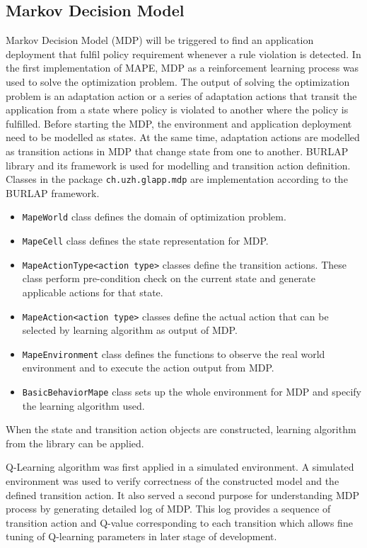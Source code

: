 \documentclass{seal_thesis}
\begin{document}
\subsection{Markov Decision Model}
Markov Decision Model (MDP) will be triggered to find an application deployment that fulfil policy requirement whenever a rule violation is detected.
In the first implementation of MAPE, MDP as a reinforcement learning process was used to solve the optimization problem.
The output of solving the optimization problem is an adaptation action or a series of adaptation actions that transit the application from a state where policy is violated to another where the policy is fulfilled.
Before starting the MDP, the environment and application deployment need to be modelled as states.
At the same time, adaptation actions are modelled as transition actions in MDP that change state from one to another.
BURLAP library and its framework is used for modelling and transition action definition.
Classes in the package \texttt{ch.uzh.glapp.mdp} are implementation according to the BURLAP framework. 
\begin{itemize}
\item \texttt{MapeWorld} class defines the domain of optimization problem.
\item \texttt{MapeCell} class defines the state representation for MDP.
\item \texttt{MapeActionType<action type>} classes define the transition actions.
These class perform pre-condition check on the current state and generate applicable actions for that state.
\item \texttt{MapeAction<action type>} classes define the actual action that can be selected by learning algorithm as output of MDP.
\item \texttt{MapeEnvironment} class defines the functions to observe the real world environment and to execute the action output from MDP.
\item \texttt{BasicBehaviorMape} class sets up the whole environment for MDP and specify the learning algorithm used.
\end{itemize}
When the state and transition action objects are constructed, learning algorithm from the library can be applied.

Q-Learning algorithm was first applied in a simulated environment.
A simulated environment was used to verify correctness of the constructed model and the defined transition action.
It also served a second purpose for understanding MDP process by generating detailed log of MDP.
This log provides a sequence of transition action and Q-value corresponding to each transition which allows fine tuning of Q-learning parameters in later stage of development.
\end{document}
